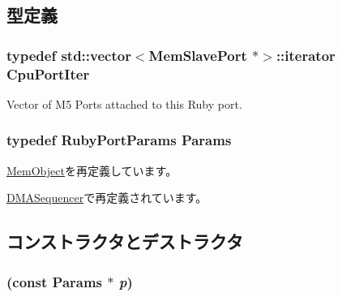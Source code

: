 \subsection{型定義}
\hypertarget{classRubyPort_a0479a75b096e758f414b419c517de782}{
\subsubsection[{CpuPortIter}]{\setlength{\rightskip}{0pt plus 5cm}typedef {\bf std::vector}$<${\bf MemSlavePort} $\ast$$>$::iterator {\bf CpuPortIter}}}
\label{classRubyPort_a0479a75b096e758f414b419c517de782}
Vector of M5 Ports attached to this Ruby port. \hypertarget{classRubyPort_a73ffda3b6b10849321fd359baf61eb3c}{
\subsubsection[{Params}]{\setlength{\rightskip}{0pt plus 5cm}typedef RubyPortParams {\bf Params}}}
\label{classRubyPort_a73ffda3b6b10849321fd359baf61eb3c}


\hyperlink{classMemObject_a905bbc621eeec0ed08859e21c8c95412}{MemObject}を再定義しています。

\hyperlink{classDMASequencer_a9827bc75ea7fc70f8a78d2545226f251}{DMASequencer}で再定義されています。

\subsection{コンストラクタとデストラクタ}
\hypertarget{classRubyPort_a48daea2300eda2ed192847716fe85997}{
\subsubsection[{RubyPort}]{ (const {\bf Params} $\ast$ {\em p})}}
\label{classRubyPort_a48daea2300eda2ed192847716fe85997}



